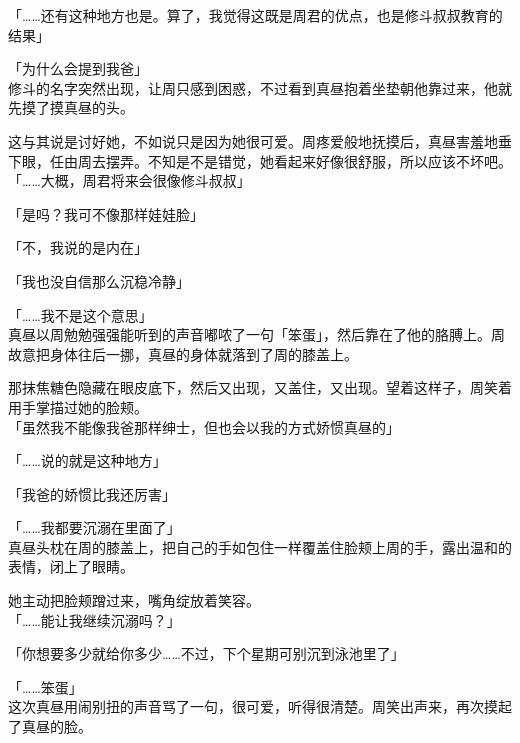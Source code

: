 「……还有这种地方也是。算了，我觉得这既是周君的优点，也是修斗叔叔教育的结果」

「为什么会提到我爸」\\

修斗的名字突然出现，让周只感到困惑，不过看到真昼抱着坐垫朝他靠过来，他就先摸了摸真昼的头。

这与其说是讨好她，不如说只是因为她很可爱。周疼爱般地抚摸后，真昼害羞地垂下眼，任由周去摆弄。不知是不是错觉，她看起来好像很舒服，所以应该不坏吧。\\

「……大概，周君将来会很像修斗叔叔」

「是吗？我可不像那样娃娃脸」

「不，我说的是内在」

「我也没自信那么沉稳冷静」

「……我不是这个意思」\\

真昼以周勉勉强强能听到的声音嘟哝了一句「笨蛋」，然后靠在了他的胳膊上。周故意把身体往后一挪，真昼的身体就落到了周的膝盖上。

那抹焦糖色隐藏在眼皮底下，然后又出现，又盖住，又出现。望着这样子，周笑着用手掌描过她的脸颊。\\

「虽然我不能像我爸那样绅士，但也会以我的方式娇惯真昼的」

「……说的就是这种地方」

「我爸的娇惯比我还厉害」

「……我都要沉溺在里面了」\\

真昼头枕在周的膝盖上，把自己的手如包住一样覆盖住脸颊上周的手，露出温和的表情，闭上了眼睛。

她主动把脸颊蹭过来，嘴角绽放着笑容。\\

「……能让我继续沉溺吗？」

「你想要多少就给你多少……不过，下个星期可别沉到泳池里了」

「……笨蛋」\\

这次真昼用闹别扭的声音骂了一句，很可爱，听得很清楚。周笑出声来，再次摸起了真昼的脸。
